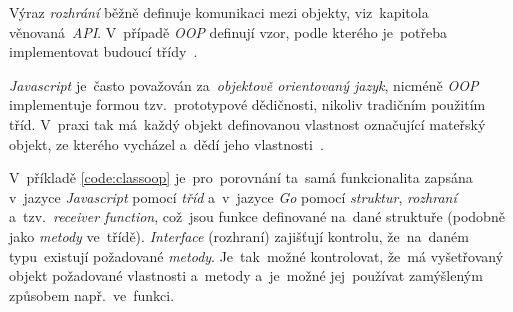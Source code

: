 \documentclass[11pt,a4paper]{report}
\begin{document}
            Výraz \emph{rozhrání} běžně definuje komunikaci mezi objekty, viz~kapitola věnovaná~\emph{API}. V~případě \emph{OOP} definují vzor, podle kterého je~potřeba implementovat budoucí třídy~\cite{go:OOP}.
            
            \emph{Javascript} je~často považován za~\emph{objektově orientovaný jazyk}, nicméně \emph{OOP} implementuje formou tzv.~prototypové dědičnosti, nikoliv tradičním použitím tříd. V~praxi tak má~každý objekt definovanou vlastnost označující mateřský objekt, ze kterého vycházel a~dědí jeho vlastnosti~\cite[2.1.01]{kantor_javascript}.
            
            V~příkladě \ref{code:classoop} je~pro~porovnání ta~samá funkcionalita zapsána v~jazyce \emph{Javascript} pomocí \emph{tříd} a~v~jazyce \emph{Go} pomocí \emph{struktur}, \emph{rozhraní} a~tzv.~\emph{receiver function}, což~jsou funkce definované na~dané struktuře (podobně jako \emph{metody} ve~třídě). \emph{Interface} (rozhraní) zajišťují kontrolu, že~na~daném typu~existují požadované \emph{metody}. Je~tak~možné kontrolovat, že~má vyšetřovaný objekt požadované vlastnosti a~metody a~je~možné jej~používat zamýšleným způsobem např.~ve~funkci.~\cite{go:OOP}
\end{document}
